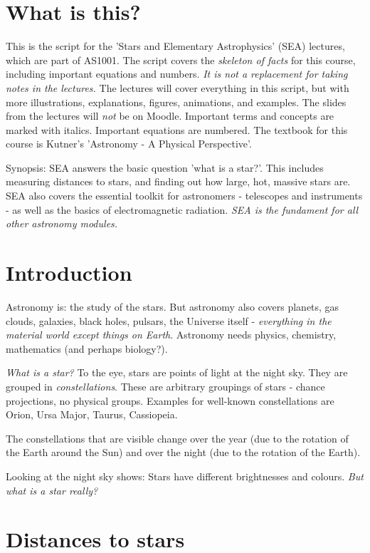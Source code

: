 \section{What is this?}

This is the script for the 'Stars and Elementary Astrophysics' (SEA) lectures, which are part of AS1001. The script covers the \textit{skeleton of facts} for this course, including important equations and numbers. \textit{It is not a replacement for taking notes in the lectures.} The lectures will cover everything in this script, but with more illustrations, explanations, figures, animations, and examples. The slides from the lectures will \textit{not} be on Moodle. Important terms and concepts are marked with italics. Important equations are numbered. The textbook for this course is Kutner's 'Astronomy - A Physical Perspective'. 

Synopsis: SEA answers the basic question 'what is a star?'. This includes measuring distances to stars, and finding out how large, hot, massive stars are. SEA also covers the essential toolkit for astronomers - telescopes and instruments - as well as the basics of electromagnetic radiation. \textit{SEA is the fundament for all other astronomy modules.}

\section{Introduction}

Astronomy is: the study of the stars. But astronomy also covers planets, gas clouds, galaxies, black holes, pulsars, the Universe itself - \textit{everything in the material world except things on Earth}. Astronomy needs physics, chemistry, mathematics (and perhaps biology?).

\textit{What is a star?} To the eye, stars are points of light at the night sky. They are grouped in \textit{constellations}. These are arbitrary groupings of stars - chance projections, no physical groups. Examples for well-known constellations are Orion, Ursa Major, Taurus, Cassiopeia. 

The constellations that are visible change over the year (due to the rotation of the Earth around the Sun) and over the night (due to the rotation of the Earth). 

Looking at the night sky shows: Stars have different brightnesses and colours. \textit{But what is a star really?}

\section{Distances to stars}

